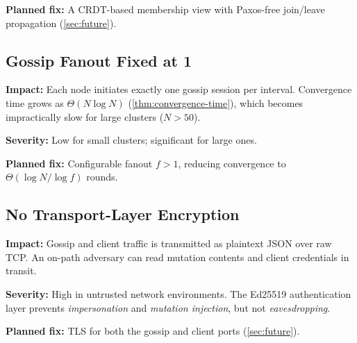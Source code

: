 \textbf{Planned fix:} A CRDT-based membership view with Paxos-free join/leave
propagation (\cref{sec:future}).

\subsection{Gossip Fanout Fixed at 1}

\textbf{Impact:} Each node initiates exactly one gossip session per interval.
Convergence time grows as $\Theta(N \log N)$ (\cref{thm:convergence-time}),
which becomes impractically slow for large clusters ($N > 50$).

\textbf{Severity:} Low for small clusters; significant for large ones.

\textbf{Planned fix:} Configurable fanout $f > 1$, reducing convergence to
$\Theta(\log N / \log f)$ rounds.

\subsection{No Transport-Layer Encryption}

\textbf{Impact:} Gossip and client traffic is transmitted as plaintext JSON over
raw TCP. An on-path adversary can read mutation contents and client credentials
in transit.

\textbf{Severity:} High in untrusted network environments. The Ed25519
authentication layer prevents \emph{impersonation} and \emph{mutation
injection}, but not \emph{eavesdropping}.

\textbf{Planned fix:} TLS for both the gossip and client ports (\cref{sec:future}).
